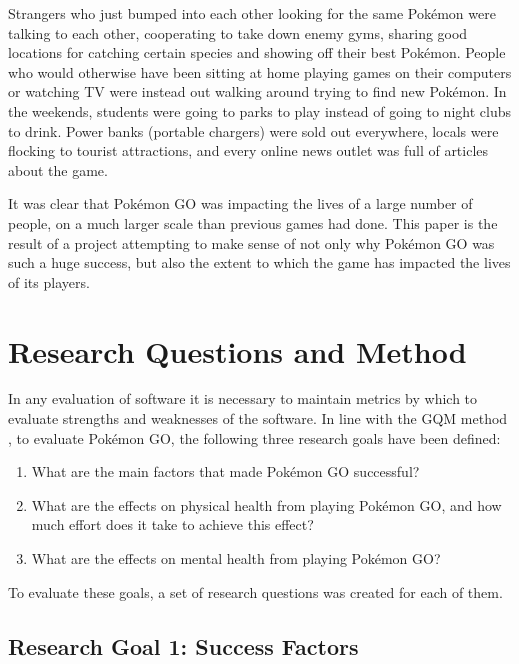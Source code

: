 Strangers who just bumped into each other looking for the same Pokémon were talking to each other, cooperating to take down enemy gyms, sharing good locations for catching certain species and showing off their best Pokémon. People who would otherwise have been sitting at home playing games on their computers or watching TV were instead out walking around trying to find new Pokémon. In the weekends, students were going to parks to play instead of going to night clubs to drink.  Power banks (portable chargers) were sold out everywhere, locals were flocking to tourist attractions, and every online news outlet was full of articles about the game.

It was clear that Pokémon GO was impacting the lives of a large number of people, on a much larger scale than previous games had done. This paper is the result of a project attempting to make sense of not only why Pokémon GO was such a huge success, but also the extent to which the game has impacted the lives of its players.

\section{Research Questions and Method}
\label{section:research-questions}

In any evaluation of software it is necessary to maintain metrics by which to evaluate strengths and weaknesses of the software. In line with the GQM method , to evaluate Pokémon GO, the following three research goals have been defined:

\begin{enumerate}
	\item What are the main factors that made Pokémon GO successful?
	\item What are the effects on physical health from playing Pokémon GO, and how much effort does it take to achieve this effect?
	\item What are the effects on mental health from playing Pokémon GO?
\end{enumerate}

To evaluate these goals, a set of research questions was created for each of them.

\subsection{Research Goal 1: Success Factors}
\label{rg1}

